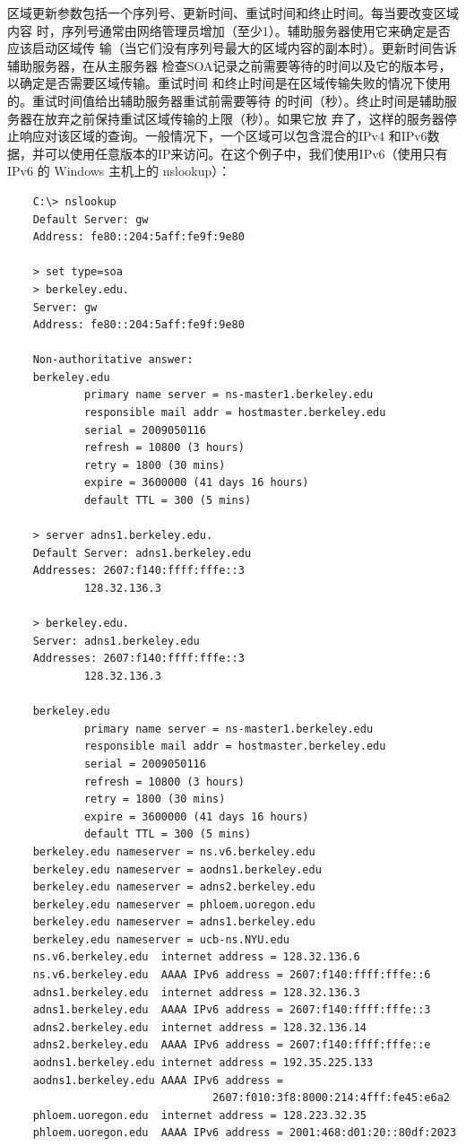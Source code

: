 区域更新参数包括一个序列号、更新时间、重试时间和终止时间。每当要改变区域内容
时，序列号通常由网络管理员增加（至少1）。辅助服务器使用它来确定是否应该启动区域传
输（当它们没有序列号最大的区域内容的副本时）。更新时间告诉辅助服务器，在从主服务器
检查SOA记录之前需要等待的时间以及它的版本号，以确定是否需要区域传输。重试时间
和终止时间是在区域传输失败的情况下使用的。重试时间值给出辅助服务器重试前需要等待
的时间（秒）。终止时间是辅助服务器在放弃之前保持重试区域传输的上限（秒）。如果它放
弃了，这样的服务器停止响应对该区域的查询。一般情况下，一个区域可以包含混合的IPv4
和IPv6数据，并可以使用任意版本的IP来访问。在这个例子中，我们使用IPv6（使用只有
IPv6 的 Windows 主机上的 nslookup）：

\begin{verbatim}
    C:\> nslookup
    Default Server: gw
    Address: fe80::204:5aff:fe9f:9e80

    > set type=soa
    > berkeley.edu.
    Server: gw
    Address: fe80::204:5aff:fe9f:9e80

    Non-authoritative answer:
    berkeley.edu
            primary name server = ns-master1.berkeley.edu
            responsible mail addr = hostmaster.berkeley.edu
            serial = 2009050116
            refresh = 10800 (3 hours)
            retry = 1800 (30 mins)
            expire = 3600000 (41 days 16 hours)
            default TTL = 300 (5 mins)

    > server adns1.berkeley.edu.
    Default Server: adns1.berkeley.edu
    Addresses: 2607:f140:ffff:fffe::3
            128.32.136.3

    > berkeley.edu.
    Server: adns1.berkeley.edu
    Addresses: 2607:f140:ffff:fffe::3
            128.32.136.3

    berkeley.edu
            primary name server = ns-master1.berkeley.edu
            responsible mail addr = hostmaster.berkeley.edu
            serial = 2009050116
            refresh = 10800 (3 hours)
            retry = 1800 (30 mins)
            expire = 3600000 (41 days 16 hours)
            default TTL = 300 (5 mins)
    berkeley.edu nameserver = ns.v6.berkeley.edu
    berkeley.edu nameserver = aodns1.berkeley.edu
    berkeley.edu nameserver = adns2.berkeley.edu
    berkeley.edu nameserver = phloem.uoregon.edu
    berkeley.edu nameserver = adns1.berkeley.edu
    berkeley.edu nameserver = ucb-ns.NYU.edu
    ns.v6.berkeley.edu  internet address = 128.32.136.6
    ns.v6.berkeley.edu  AAAA IPv6 address = 2607:f140:ffff:fffe::6
    adns1.berkeley.edu  internet address = 128.32.136.3
    adns1.berkeley.edu  AAAA IPv6 address = 2607:f140:ffff:fffe::3
    adns2.berkeley.edu  internet address = 128.32.136.14
    adns2.berkeley.edu  AAAA IPv6 address = 2607:f140:ffff:fffe::e
    aodns1.berkeley.edu internet address = 192.35.225.133
    aodns1.berkeley.edu AAAA IPv6 address =
                                2607:f010:3f8:8000:214:4fff:fe45:e6a2
    phloem.uoregon.edu  internet address = 128.223.32.35
    phloem.uoregon.edu  AAAA IPv6 address = 2001:468:d01:20::80df:2023
\end{verbatim}
